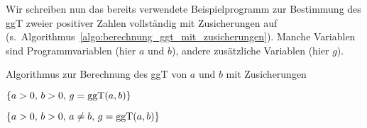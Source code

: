 \vspace{2mm} %

Wir schreiben nun das bereits verwendete Beispielprogramm zur Bestimmung des ggT zweier positiver Zahlen vollständig mit Zusicherungen auf (s.~Algorithmus~\ref{algo:berechnung_ggt_mit_zusicherungen}). Manche Variablen sind Programmvariablen (hier $a$ und $b$), andere zusätzliche 
\linebreak %
Variablen (hier $g$).

\vspace{-2mm}

\begin{algorithm}
	\caption{Algorithmus zur Berechnung des ggT von $a$ und $b$ mit Zusicherungen}
	\label{algo:berechnung_ggt_mit_zusicherungen}
	
	\vspace{2mm} %
	\vspace{\baselineskip}
	
	
	\vspace{2mm} %
	\vspace{\baselineskip}
	
	\HiLi $\{a > 0, \, b > 0, \, g = {\text{ggT}}(a,b)\}$ \\
	
	\vspace{2mm} %
	\vspace{\baselineskip}
	
	{
		\vspace{2mm} %
		\vspace{\baselineskip}
		
		\HiLi $\{a > 0, \, b > 0, \, a \neq b, \, g = {\text{ggT}}(a,b)\}$ \\
		
		\vspace{2mm} %
		\vspace{\baselineskip}
		
	}
	\;
	

\end{algorithm}
